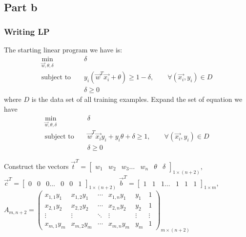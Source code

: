 \subsection{Part b}
\subsubsection{Writing LP}
The starting linear program we have is:
\begin{eqnarray*}
\min_{\vec{w}, \theta, \delta} & & \delta  \label{eq:lin_prog_discriminant_obj}\\
\textrm{subject to } & & y_i(\vec{w}^T \vec{x_i} + \theta) \geq 1 - \delta, \qquad \forall (\vec{x_i},y_i) \in D  \label{eq:lin_prog_discriminant_constraint}\\
& & \delta \geq 0  \label{eq:lin_prog_discriminant_bound}
\end{eqnarray*}
where $D$ is the data set of all training examples. Expand the set of equation we have 
\begin{eqnarray*}
\min_{\vec{w}, \theta, \delta} & & \delta  \label{eq:lin_prog_discriminant_obj}\\
\textrm{subject to } & & \vec{w}^T \vec{x_i}y_i + y_i\theta + \delta \geq 1, \qquad \forall (\vec{x_i},y_i) \in D  \label{eq:lin_prog_discriminant_constraint}\\
& & \delta \geq 0  \label{eq:lin_prog_discriminant_bound}
\end{eqnarray*}

\noindent Construct the vectors $\vec{t}^T =
\begin{bmatrix}
w_1 & w_2 & w_3 \ldots & w_n & \theta & \delta
\end{bmatrix}_{1\times(n+2)}$, $\vec{c}^T= \begin{bmatrix}
0 & 0 & 0 \ldots & 0 & 0 & 1
\end{bmatrix}_{1\times(n+2)}$ $\vec{b}^T= \begin{bmatrix}
1 & 1 & 1 \ldots & 1 & 1 & 1
\end{bmatrix}_{1\times m}$, $A_{m,n+2} =
\begin{pmatrix}
x_{1,1}y_1 & x_{1,2}y_1 & \cdots & x_{1,n}y_1 & y_1 & 1 \\
x_{2,1}y_2 & x_{2,2}y_2 & \cdots & x_{2,n}y_2 & y_2 & 1\\
\vdots  & \vdots  & \ddots & \vdots & \vdots & \vdots \\
x_{m,1}y_m & x_{m,2}y_m & \cdots & x_{m,n}y_m & y_m & 1
\end{pmatrix}_{m\times (n+2)}$

